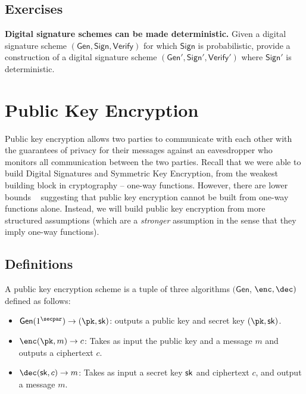 \documentclass[12pt]{tufte-book}
\newcommand{\gen}{\mathsf{Gen}}
\begin{document}
\section*{Exercises}
\begin{exercise}
\textbf{Digital signature schemes can be made deterministic.} Given a digital signature scheme $(\mathsf{Gen}, \mathsf{Sign}, \mathsf{Verify})$ for which $\mathsf{Sign}$ is probabilistic, provide a construction of a digital signature scheme $(\mathsf{Gen}', \mathsf{Sign}', \mathsf{Verify}')$ where $\mathsf{Sign}'$ is deterministic.
\end{exercise}

\chapter{Public Key Encryption}
Public key encryption allows two parties
to communicate with each other with the guarantees of privacy for their messages against an eavesdropper who monitors all communication between the two parties. Recall that we were able to build Digital Signatures and Symmetric Key Encryption, from the weakest building block in cryptography -- one-way functions. However, there are lower bounds
~\cite{STOC:ImpRud89} 
suggesting that public key encryption cannot be built from one-way functions alone. Instead, we will build public key encryption from more structured assumptions (which are a \emph{stronger} assumption in the sense that they imply one-way functions).

\section{Definitions}
\begin{definition}
    A public key encryption scheme is a tuple of three algorithms $(\gen$, $\enc, \dec)$ defined as follows:
    \begin{itemize}
        \item $\gen(1^\secpar) \to (\pk, \sk)$: outputs a public key and secret key $(\pk, \sk)$.

        \item $\enc(\pk, m) \to c$: Takes as input the public key and a message $m$ and outputs a ciphertext $c$.

        \item $\dec(\sk, c) \to m$: Takes as input a secret key $\mathsf{sk}$ and ciphertext $c$, and output a message $m$.
    \end{itemize}
\end{definition}
\end{document}
